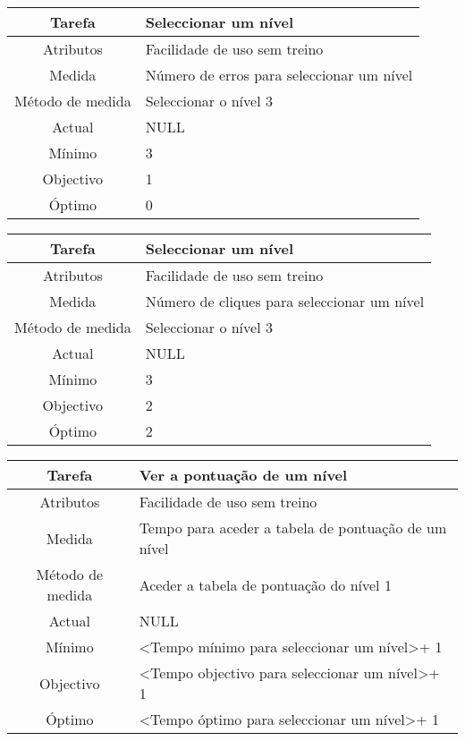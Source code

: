\begin{center}
	\begin{tabular} {|c|p{10cm}|}
		\hline
		Tarefa & Seleccionar um nível \\
		\hline
		Atributos & Facilidade de uso sem treino \\
		\hline
		Medida & Número de erros para seleccionar um nível \\
		\hline
		Método de medida & Seleccionar o nível 3 \\
		\hline
		Actual & NULL \\
		Mínimo & 3 \\
		Objectivo & 1 \\
		Óptimo & 0 \\
		\hline
	\end{tabular}
\end{center}

\begin{center}
	\begin{tabular} {|c|p{10cm}|}
		\hline
		Tarefa & Seleccionar um nível \\
		\hline
		Atributos & Facilidade de uso sem treino \\
		\hline
		Medida & Número de cliques para seleccionar um nível \\
		\hline
		Método de medida & Seleccionar o nível 3 \\
		\hline
		Actual & NULL \\
		Mínimo & 3 \\
		Objectivo & 2 \\
		Óptimo & 2 \\
		\hline
	\end{tabular}
\end{center}

\begin{center}
	\begin{tabular} {|c|p{10cm}|}
		\hline
		Tarefa & Ver a pontuação de um nível \\
		\hline
		Atributos & Facilidade de uso sem treino \\
		\hline
		Medida & Tempo para aceder a tabela de pontuação de um nível \\
		\hline
		Método de medida & Aceder a tabela de pontuação do nível 1 \\
		\hline
		Actual & NULL \\
		Mínimo & \textless Tempo mínimo para seleccionar um nível\textgreater + 1 \\
		Objectivo & \textless Tempo objectivo para seleccionar um nível\textgreater + 1 \\
		Óptimo & \textless Tempo óptimo para seleccionar um nível\textgreater + 1 \\
		\hline
	\end{tabular}
\end{center}

